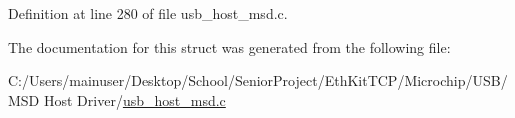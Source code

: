 Definition at line 280 of file usb\+\_\+host\+\_\+msd.\+c.



The documentation for this struct was generated from the following file\+:\begin{DoxyCompactItemize}
\item 
C\+:/\+Users/mainuser/\+Desktop/\+School/\+Senior\+Project/\+Eth\+Kit\+T\+C\+P/\+Microchip/\+U\+S\+B/\+M\+S\+D Host Driver/\hyperlink{usb__host__msd_8c}{usb\+\_\+host\+\_\+msd.\+c}\end{DoxyCompactItemize}
